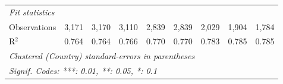 \begin{tabular}{lcccccccc}
   \midrule \emph{Fit statistics}\\
   Observations                                                      & 3,171        & 3,170        & 3,110        & 2,839   & 2,839   & 2,029          & 1,904          & 1,784\\  
   R$^2$                                                             & 0.764        & 0.764        & 0.766        & 0.770   & 0.770   & 0.783          & 0.785          & 0.785\\  
   \midrule
   \multicolumn{9}{l}{\emph{Clustered (Country) standard-errors in parentheses}}\\
   \multicolumn{9}{l}{\emph{Signif. Codes: ***: 0.01, **: 0.05, *: 0.1}}\\
\end{tabular}
\par\endgroup


